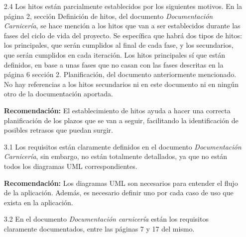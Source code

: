 \documentclass[a4paper,12pt]{report}
\begin{document}
\begin{enumerate}
    \vspace{0.05cm}
    
    \item[2.4] Los hitos están parcialmente establecidos por los siguientes motivos.
    En la página 2, sección Definición de hitos, del documento \textit{Documentación Carnicería},
    se hace mención a los hitos que van a ser establecidos durante las fases del 
    ciclo de vida del proyecto. Se específica que habrá dos tipos de hitos: los 
    principales, que serán cumplidos al final de cada fase, y los secundarios, 
    que serán cumplidos en cada iteración. Los hitos principales sí que están
    definidos, en base a unas fases que no casan con las fases descritas en la
    página 6 sección 2. Planificación, del documento anteriormente mencionado.
    No hay referencias a los hitos secundarios ni en este documento ni en ningún
    otro de la documentación aportada.\\
    
    \vspace{0.05cm}
    
    \textbf{Recomendación:} El establecimiento de hitos ayuda a hacer una correcta
    planificación de los plazos que se van a seguir, facilitando la identificación
    de posibles retrasos que puedan surgir.\\
    
    \vspace{0.05cm}
    
    \item[3.1] Los requisitos están claramente definidos en el documento \textit{Documentación Carnicería},
    sin embargo, no están totalmente detallados, ya que no están todos los diagramas UML correspondientes.\\
    
    \vspace{0.05cm}
    
    \textbf{Recomendación:} Los diagramas UML son necesarios para entender el flujo de la aplicación.
    Además, es necesario definir uno por cada caso de uso que exista en la aplicación.\\
    
    \vspace{0.05cm}
    
    \item[3.2] En el documento \textit{Documentación carnicería} están los requisitos claramente documentados, entre las páginas 7 y 17 del mismo.\\
    

\end{enumerate}
\end{document}
